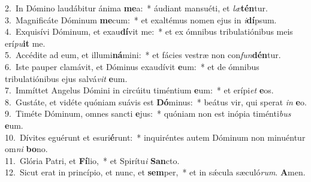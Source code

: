 {2.~}In Dómino laudábitur ánima \textbf{me}a:~* áudiant mansuéti, et \textit{læ}\textbf{tén}tur.\\
{3.~}Magnificáte Dóminum \textbf{me}cum:~* et exaltémus nomen ejus in \textit{i}\textbf{dí}psum.\\
{4.~}Exquisívi Dóminum, et exau\textbf{dí}vit me:~* et ex ómnibus tribulatiónibus meis erí\textit{pu}\textbf{it} me.\\
{5.~}Accédite ad eum, et illumi\textbf{ná}mini:~* et fácies vestræ non con\textit{fun}\textbf{dén}tur.\\
{6.~}Iste pauper clamávit, et Dóminus exaudívit \textbf{e}um:~* et de ómnibus tribulatiónibus ejus salvá\textit{vit} \textbf{e}um.\\
{7.~}Immíttet Angelus Dómini in circúitu timéntium \textbf{e}um:~* et erípi\textit{et} \textbf{e}os.\\
{8.~}Gustáte, et vidéte quóniam suávis est \textbf{Dó}minus:~* beátus vir, qui sperat \textit{in} \textbf{e}o.\\
{9.~}Timéte Dóminum, omnes sancti \textbf{e}jus:~* quóniam non est inópia timénti\textit{bus} \textbf{e}um.\\
{10.~}Dívites eguérunt et esuri\textbf{é}runt:~* inquiréntes autem Dóminum non minuéntur om\textit{ni} \textbf{bo}no.\\
{11.~}Glória Patri, et \textbf{Fí}lio,~* et Spirítu\textit{i} \textbf{San}cto.\\
{12.~}Sicut erat in princípio, et nunc, et \textbf{sem}per,~* et in sǽcula sæculó\textit{rum}. \textbf{A}men.\\
